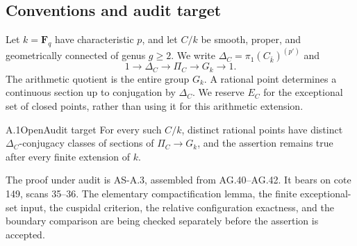 \subsection{Conventions and audit target}
Let \(k=\mathbf F_q\) have characteristic \(p\), and let \(C/k\)
be smooth, proper, and geometrically connected of genus \(g\geq2\).
We write \(\Delta_C=\pi_1(C_{\bar k})^{(p')}\) and
\[
1\longrightarrow\Delta_C\longrightarrow\Pi_C
 \longrightarrow G_k\longrightarrow1.
\]
The arithmetic quotient is the entire group \(G_k\). A rational
point determines a continuous section up to conjugation by
\(\Delta_C\). We reserve \(E_C\) for the exceptional set of
closed points, rather than using it for this arithmetic extension.

\begin{claim}{A.1}{Open}{Audit target}
For every such \(C/k\), distinct rational points have distinct
\(\Delta_C\)-conjugacy classes of sections of \(\Pi_C\to G_k\),
and the assertion remains true after every finite extension of \(k\).
\end{claim}
The proof under audit is AS-A.3, assembled from AG.40--AG.42.
It bears on cote 149, scans 35--36. The elementary compactification
lemma, the finite exceptional-set input, the cuspidal criterion,
the relative configuration exactness, and the boundary comparison
are being checked separately before the assertion is accepted.
